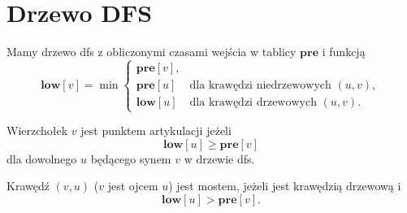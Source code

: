 \section{Drzewo DFS}

Mamy drzewo dfs z obliczonymi czasami wejścia w tablicy $\mathbf{pre}$ i funkcją
\[\mathbf{low}[v] = \min \begin{cases} 
	\mathbf{pre}[v], \\
	\mathbf{pre}[u] & \text{dla krawędzi niedrzewowych } (u, v), \\
	\mathbf{low}[u] & \text{dla krawędzi drzewowych } (u, v).
\end{cases}\]

Wierzchołek $v$ jest punktem artykulacji jeżeli
\[\mathbf{low}[u] \geq \mathbf{pre}[v]\]
dla dowolnego $u$ będącego synem $v$ w drzewie dfs.

Krawędź $(v, u)$ ($v$ jest ojcem $u$) jest mostem, jeżeli jest krawędzią drzewową i 
\[ \mathbf{low}[u] > \mathbf{pre}[v].\]
